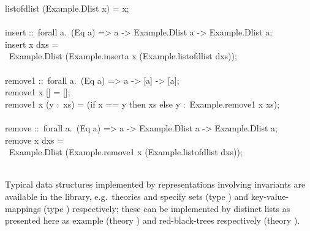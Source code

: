 \begin{isabellebody}
\begin{isamarkuptext}
\hspace*{0pt}list{}of{}dlist (Example.Dlist x) = x;\\
\hspace*{0pt}\\
\hspace*{0pt}insert ::~forall a.~(Eq a) => a -> Example.Dlist a -> Example.Dlist a;\\
\hspace*{0pt}insert x dxs =\\
\hspace*{0pt} ~Example.Dlist (Example.inserta x (Example.list{}of{}dlist dxs));\\
\hspace*{0pt}\\
\hspace*{0pt}remove1 ::~forall a.~(Eq a) => a -> [a] -> [a];\\
\hspace*{0pt}remove1 x [] = [];\\
\hspace*{0pt}remove1 x (y :~xs) = (if x == y then xs else y :~Example.remove1 x xs);\\
\hspace*{0pt}\\
\hspace*{0pt}remove ::~forall a.~(Eq a) => a -> Example.Dlist a -> Example.Dlist a;\\
\hspace*{0pt}remove x dxs =\\
\hspace*{0pt} ~Example.Dlist (Example.remove1 x (Example.list{}of{}dlist dxs));\\
\hspace*{0pt}\\
\hspace*{0pt}{\char125}%
\end{isamarkuptext}%
\isamarkuptrue%
%
\endisatagquote
{\isafoldquote}%
%
\isadelimquote
%
\endisadelimquote
%
\begin{isamarkuptext}%
Typical data structures implemented by representations involving
  invariants are available in the library, e.g.~theories \hyperlink{theory.Fset}{\mbox{}} and \hyperlink{theory.Mapping}{\mbox{}} specify sets (type ) and
  key-value-mappings (type ) respectively;
  these can be implemented by distinct lists as presented here as
  example (theory \hyperlink{theory.Dlist}{\mbox{}}) and red-black-trees respectively
  (theory \hyperlink{theory.RBT}{\mbox{}}).%
\end{isamarkuptext}%
\isamarkuptrue%
%
\isadelimtheory
%
\endisadelimtheory
%
\isatagtheory
{}\isamarkupfalse%
%
\endisatagtheory
{\isafoldtheory}%
%
\isadelimtheory
%
\endisadelimtheory
\isanewline
\end{isabellebody}%
